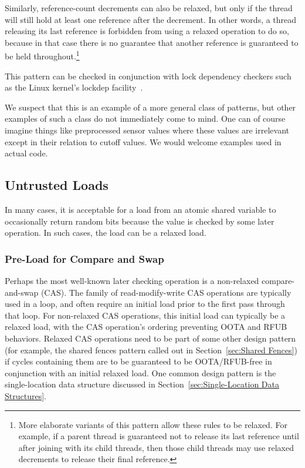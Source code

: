 \documentclass[10]{article}
\begin{document}
Similarly, reference-count decrements can also be relaxed, but only if
the thread will still hold at least one reference after the decrement.
In other words, a thread releasing its last reference is forbidden
from using a relaxed operation to do so, because in that case there
is no guarantee that another reference is guaranteed to be held
throughout.\footnote{
	More elaborate variants of this pattern allow these rules to
	be relaxed.
	For example, if a parent thread is guaranteed not to release
	its last reference until after joining with its child threads,
	then those child threads may use relaxed decrements to release
	their final reference.}

This pattern can be checked in conjunction with lock dependency checkers
such as the Linux kernel's lockdep facility~\cite{JonathanCorbet2006lockdep}.

We suspect that this is an example of a more general class of patterns,
but other examples of such a class do not immediately come to mind.
One can of course imagine things like preprocessed sensor values where
these values are irrelevant except in their relation to cutoff values.
We would welcome examples used in actual code.

\subsection{Untrusted Loads}
\label{sec:Untrusted Loads}

In many cases, it is acceptable for a load from an atomic shared variable
to occasionally return random bits because the value is checked by
some later operation.
In such cases, the load can be a relaxed load.

\subsubsection{Pre-Load for Compare and Swap}
\label{sec:Pre-Load for Compare and Swap}

Perhaps the most well-known later checking operation is a non-relaxed
compare-and-swap (CAS).
The  family of read-modify-write
CAS operations are typically used in a loop, and often require an initial
load prior to the first pass through that loop.
For non-relaxed CAS operations, this initial load can typically be a
relaxed load, with the CAS operation's ordering preventing OOTA and RFUB
behaviors.
Relaxed CAS operations need to be part of some other design pattern
(for example, the shared fences pattern called out in
Section~\ref{sec:Shared Fences})
if cycles containing them are to be guaranteed to be OOTA/RFUB-free in
conjunction with an initial relaxed load.
One common design pattern is the single-location data structure discussed in
Section~\ref{sec:Single-Location Data Structures}.
\end{document}
